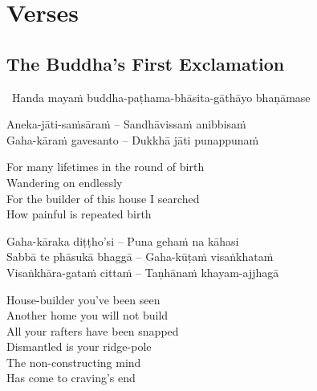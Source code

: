 \ifdesktopversion
{}
\else
{}
\fi

\chapter{Verses}

\section{The Buddha's First Exclamation}
\label{buddhas-first-exclamation}

\begin{leader}
  \anglebracketleft\ \hspace{-0.5mm}Handa mayaṁ buddha-paṭhama-bhāsita-gāthāyo bhaṇāmase \hspace{-0.5mm}\anglebracketright\
\end{leader}

\begin{verses}
  Aneka-jāti-saṁsāraṁ – Sandhāvissaṁ anibbisaṁ\\
  Gaha-kāraṁ gavesanto – Dukkhā jāti punappunaṁ
\end{verses}

\begin{english-verses}
  For many lifetimes in the round of birth\\
  Wandering on endlessly\\
  For the builder of this house I searched\\
  How painful is repeated birth
\end{english-verses}

\begin{verses}
  Gaha-kāraka diṭṭho'si – Puna gehaṁ na kāhasi\\
  Sabbā te phāsukā bhaggā – Gaha-kūṭaṁ visaṅkhataṁ\\
  Visaṅkhāra-gataṁ cittaṁ – Taṇhānaṁ khayam-ajjhagā
\end{verses}

\begin{english-verses}
  House-builder you've been seen\\
  Another home you will not build\\
  All your rafters have been snapped\\
  Dismantled is your ridge-pole\\
  The non-constructing mind\\
  Has come to craving's end
\end{english-verses}

